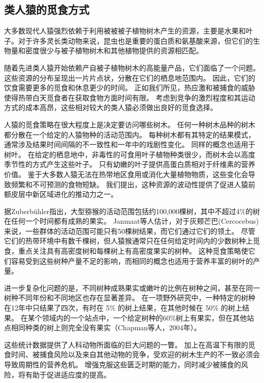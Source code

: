 \subsection{类人猿的觅食方式}

大多数现代人猿强烈依赖于利用被被被子植物树木产生的资源，主要是水果和叶子。对于许多灵长类动物来说，昆虫也是重要的蛋白质和氨基酸来源，但它们的生物量和密度很少与被子植物树木和其他植物提供的资源相匹配。


随着先进类人猿开始依赖产自被子植物树木的高能量产品，它们面临了一个问题。
这些资源的分布呈现出一片片点状，分散在它们的栖息地范围内。
因此，它们的饮食需要更多的觅食和休息更少的时间。
正如我们所见，热应激和被捕食的威胁使得热带白天觅食者在获取食物方面时间有限。
考虑到竞争的激烈程度和其运动方式的成本高昂，这些相对较大的类人猿必须做出良好的觅食选择。


人猿的觅食策略在很大程度上是决定要访问哪些树木。
任何一种树木品种的树木都分散在一个给定的人猿物种的活动范围内。
每种树木都有其特定的结果模式，通常涉及结果时间间隔的不一致性和一年中的戏剧性变化\cite{chapman1999fruit,janmaat2006primates}。
同样的概念也适用于树叶。
在给定的栖息地中，非毒性的可食用叶子植物种类很少，而树木会以高度季节性的方式产生这些叶子\cite{dominy2004fruits}。
只有幼嫩的叶子提供高蛋白质相对于纤维素的营养价值。
鉴于大多数人猿无法在热带地区食用或消化大量植物物质，这些变化会导致频繁和不可预测的食物短缺。
我们提出，这种资源的波动性提供了促进人猿前额皮层中新区域进化的推动力之一。


据Zuberbühler\cite{zuberbuhler2010foraging}指出，大型猕猴的活动范围包括约100,000棵树，其中不超过4\%的树在任何一个时间都有成熟的果实。
Janmaat等人\cite{janmaat2006primates}估计，对于灰颊芒巴(Cercocebus)来说，一些群体的活动范围可能只有50棵树结果，而它们通过它们的领土。
尽管它们的热带环境中有数千棵树，但人猿猴通常只在任何给定时间内的少数树种上觅食，重点关注具有高密度树和每棵树上有高密度果实的树种\cite{janson1988food,eckardt2004cooperation}。
这种觅食策略使它们容易受到这些树种产量不足的影响，而相同的概念也适用于营养丰富的树叶的产量。


进一步复杂化问题的是，不同树种成熟果实或嫩叶的比例在树种之间，甚至在同一树种不同年份和不同地区也存在显著差异。
在一项野外研究中，一种特定的树种在12年中只结果了四次，有时在 5\% 的树上结果，在其他时候在 50\% 的树上结果。
在某个领域内的一个站点中，一个给定树种的60\%树上有果实，但在其他站点相同种类的树上则完全没有果实（Chapman等人，2004年）。


这些统计数据提供了人科动物所面临的巨大问题的一瞥。
加上在高温下有限的觅食时间、被捕食风险以及来自其他动物的竞争，受欢迎的树木生产的不一致必须会导致周期性的营养危机。
增强克服这些匮乏时期的能力，同时减少被捕食的风险，将有助于促进适应度的提高。


